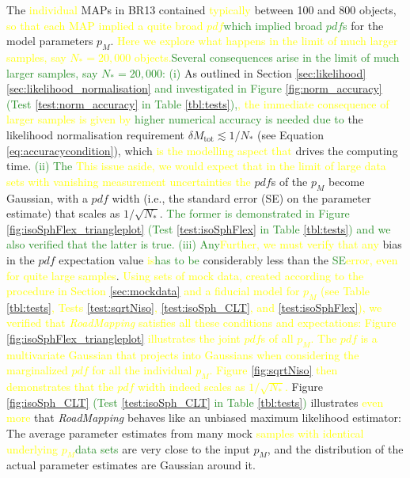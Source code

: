 \documentclass[iop,revtex4,numberedappendix,appendixfloats]{emulateapj}
\newcommand{\pdf}{\ensuremath{pdf}}
\newcommand{\pmodel}{\ensuremath{p_M}}
\newcommand{\MAP}{MAP}
\newcommand{\RM}{{\sl RoadMapping}}
\newcommand{\NEW}[1]{\textcolor{ForestGreen}{#1}}
\newcommand{\OLD}[1]{\textcolor{Yellow}{#1}}%
\begin{document}
The \OLD{individual }\MAP{}s in BR13 contained \OLD{typically }between 100 and 800 objects, \OLD{so that each \MAP{} implied  a quite broad \pdf{}}\NEW{which implied broad \pdf{}s} for the model parameters $\pmodel{}$. \OLD{Here we explore what happens in the limit of much larger samples, say $N_{*} = 20,000$ objects.}\NEW{Several consequences arise in the limit of much larger samples, say $N_{*} = 20,000$:} \NEW{(i)} As outlined in Section \OLD{\ref{sec:likelihood}}\NEW{\ref{sec:likelihood_normalisation}} \NEW{and investigated in Figure \ref{fig:norm_accuracy} (Test \ref{test:norm_accuracy} in Table \ref{tbl:tests}),}\OLD{, the immediate consequence of larger samples is given by} \NEW{higher numerical accuracy is needed due to} the likelihood normalisation requirement $\delta M_\text{tot} \lesssim 1/N_{*}$ (see Equation \eqref{eq:accuracycondition}), which \OLD{is the modelling aspect that} drives the computing time. \NEW{(ii) The} \OLD{This issue aside, we would expect that in the limit of large data sets with vanishing measurement uncertainties the} \pdf{}s of the \pmodel{} become Gaussian, with a \pdf{} width (i.e., the standard error (SE) on the parameter estimate) that scales as $1/\sqrt{N_{*}}$. \NEW{The former is demonstrated in Figure \ref{fig:isoSphFlex_triangleplot} (Test \ref{test:isoSphFlex} in Table \ref{tbl:tests}) and we also verified that the latter is true.} \NEW{(iii) Any}\OLD{Further, we must verify that any} bias in the \pdf{} expectation value \OLD{is}\NEW{has to be} considerably less than the \NEW{SE}\OLD{error, even for quite large samples}. \OLD{Using sets of mock data, created according to the procedure in Section \ref{sec:mockdata} and a fiducial model for \pmodel{} (see Table \ref{tbl:tests}, Tests \ref{test:sqrtNiso}, \ref{test:isoSph_CLT}, and \ref{test:isoSphFlex}), we verified that \RM{} satisfies all these conditions and expectations: Figure \ref{fig:isoSphFlex_triangleplot} illustrates the joint \pdf{}s of all \pmodel{}. The \pdf{} is a multivariate Gaussian that projects into Gaussians when considering the marginalized \pdf{} for all the individual \pmodel{}. Figure \ref{fig:sqrtNiso} then demonstrates that the \pdf{} width indeed scales as $1/\sqrt{N_{*}}$.} Figure \ref{fig:isoSph_CLT} \NEW{(Test \ref{test:isoSph_CLT} in Table \ref{tbl:tests})} illustrates \OLD{even more }that \RM{} behaves like an unbiased maximum likelihood estimator: The average parameter estimates from many mock \OLD{samples with identical underlying \pmodel{}}\NEW{data sets} are very close to the input \pmodel{}, and the distribution of the actual parameter estimates are Gaussian around it.
\end{document}
